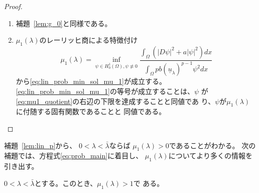 \begin{proof}
 \begin{enumerate}[1.] \sage
  \item 補題~\ref{lem:g_0}と同様である。
  \item $\mu_1(\lambda)$のレーリッヒ商による特徴付け
        \begin{equation}
         \mu_1(\lambda) = \inf_{\psi \in H_0^1(\Omega), \psi \not \equiv 0} 
        \frac{\displaystyle \int_\Omega 
        \left( \left\lvert D\psi \right\rvert^2 + a\lvert\psi\rvert^2 \right)
          dx }{\displaystyle \int_\Omega pb(\underline{u}_\lambda)^{p-1}
          \psi^2 dx } \label{eq:mu1_quotient}        
        \end{equation}
        から\eqref{eq:lin_prob_min_sol_mu_1}が成立する。
        \eqref{eq:lin_prob_min_sol_mu_1}の等号が成立することは、$\psi$
        が\eqref{eq:mu1_quotient}の右辺の下限を達成することと同値であ
        り、$\psi$が$\mu_1(\lambda)$に付随する固有関数であることと
        同値である。\qedhere
 \end{enumerate}
\end{proof}

補題~\ref{lem:lin_p}から、
$0 < \lambda < \bar{\lambda}$ならば
$\mu_1(\lambda) > 0$であることがわかる。
次の補題では、方程式\ref{eq:prob_main}に着目し、
$\mu_1(\lambda)$についてより多くの情報を引き出す。

\begin{lem} \label{lem:lin_1}
 $0 < \lambda < \bar{\lambda}$とする。このとき、$\mu_1(\lambda) > 1$で
 ある。
\end{lem}


